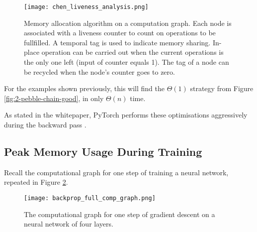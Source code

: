 \begin{figure}[h]
    \centering
    \texttt{[image: chen\_liveness\_analysis.png]}
    \caption{Memory allocation algorithm on a computation graph. Each node is associated with a liveness counter to count on operations to be fullfilled. A temporal tag is used to indicate memory sharing. In-place operation can be carried out when the current operations is the only one left (input of counter equals 1). The tag of a node can be recycled when the node’s counter goes to zero. \cite[Figure~2]{Chen2016}}
    \label{fig:2-chen-LA}
\end{figure}

For the examples shown previously, this will find the \(\Theta(1)\) strategy from Figure \ref{fig:2-pebble-chain-good}, in only \(\Theta(n)\) time.

As stated in the whitepaper, PyTorch performs these optimisations aggressively during the backward pass \cite[p.~3]{Paszke2017}.

\subsection{Peak Memory Usage During Training}
Recall the computational graph for one step of training a neural network, repeated in Figure \ref{fig:2-nn-comp-graph-2}.

\begin{figure}[htb]
    \centering
    \texttt{[image: backprop\_full\_comp\_graph.png]}
    \caption{The computational graph for one step of gradient descent on a neural network of four layers.}
    \label{fig:2-nn-comp-graph-2}
\end{figure}

